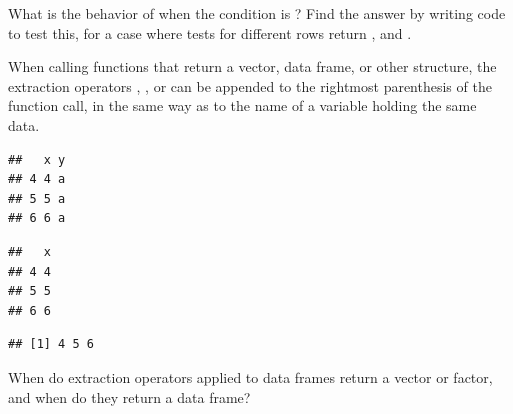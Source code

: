 \documentclass[krantz2]{krantz}\usepackage{knitr}
\begin{document}
\begin{playground}
What is the behavior of  when the condition is ? Find the answer by writing code to test this, for a case where tests for different rows return ,  and .
\end{playground}

When calling functions that return a vector, data frame, or other structure, the extraction operators \Roperator{[ ]}, \Roperator{[[ ]]}, or \Roperator{\$} can be appended to the rightmost parenthesis of the function call, in the same way as to the name of a variable holding the same data.

\begin{knitrout}\footnotesize
{}\color{fgcolor}\begin{kframe}
\begin{alltt}
 \hlopt{>} \hlstd{)[ ,} \hlopt{-}\hlstd{]}
\end{alltt}
\begin{verbatim}
##   x y
## 4 4 a
## 5 5 a
## 6 6 a
\end{verbatim}
\begin{alltt}
 \hlopt{>} \hlstd{)[ ,} \hlstd{,}  \hlstd{=} \hlstd{]}
\end{alltt}
\begin{verbatim}
##   x
## 4 4
## 5 5
## 6 6
\end{verbatim}
\begin{alltt}
 \hlopt{>} \hlstd{)[ ,} \hlstd{]}
\end{alltt}
\begin{verbatim}
## [1] 4 5 6
\end{verbatim}
\end{kframe}
\end{knitrout}

\begin{advplayground}
When do extraction operators applied to data frames return a vector or factor, and when do they return a data frame?
\end{advplayground}
\end{document}
